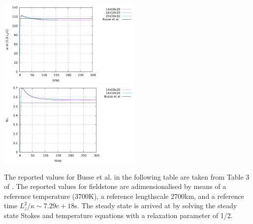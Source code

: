 \begin{center}
\includegraphics[width=7cm]{python_codes/fieldstone_20/images/wmid.pdf}
\includegraphics[width=7cm]{python_codes/fieldstone_20/images/Nu.pdf}
\end{center}


The reported values for Busse et al. in the following table are taken from Table 3 of \cite{bucc93}.
The reported values for fieldstone are adimensionalised by means of a reference temperature (3700K),
a reference lengthscale 2700km, and a reference time $L_z^2/\kappa\sim 7.29e+18$s.
The steady state is arrived at by solving the steady state Stokes and temperature equations 
with a relaxation parameter of 1/2.



